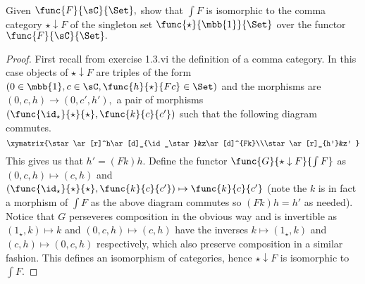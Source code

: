 \documentclass[../../main]{subfiles}
\begin{document}
\paragraph{}

\begin{exercise}
Given $ \func{F}{\sC}{\Set},$ show that $ \int F $ is isomorphic to the comma 
category $ \star\downarrow F $ of the singleton set $ 
\func{\star}{\mbb{1}}{\Set} $ over the functor $ \func{F}{\sC}{\Set}. $
\end{exercise}
\begin{proof}
	First recall from exercise 1.3.vi the definition of a comma category. In 
	this case objects of $ \star\downarrow F $ are triples of the form $ (0\in 
	\mbb{1},c\in 
	\sC,\func{h}{\star}{Fc}\in \Set) $ and the morphisms are $ (0,c,h)\to(0,c',h'),$ 
	a pair of morphisms $ (\func{\id_\star}{\star}{\star},\func{k}{c}{c'}) $ such that the
	following diagram commutes.
	\[
	\xymatrix{\star\ar[r]^h\ar[d]_{\id_\star}&z\ar[d]^{Fk}\\\star\ar[r]_{h'}&z'
	}
	\]
	This gives us that $ h'=(Fk)h.$
	Define the functor $ \func{G}{\star\downarrow F}{\int F} $ as $ (0,c,h)\mapsto 
	(c,h) $ and $ (\func{\id_\star}{\star}{\star},\func{k}{c}{c'})\mapsto \func{k}{c}{c'} $ 
	(note the $ k $ is in fact a morphism of $ \int F $ as the above diagram 
	commutes so $ (Fk)h=h' $ as needed). Notice that $ G $ perseveres 
	composition in the obvious way and
	 is invertible as $(1_\star,k)\mapsto k$ and  $ (0,c,h)\mapsto  (c,h) $ 
	 have the inverses $ k\mapsto (1_\star,k) $ and $ (c,h)\mapsto (0,c,h)$ 
	 respectively, which also preserve composition in a similar fashion. This defines an isomorphism of categories, hence $ \star\downarrow F $ is isomorphic to $ \int F. $
\end{proof}
\end{document}
